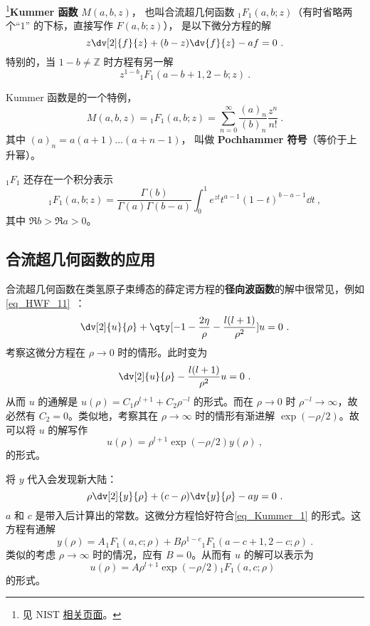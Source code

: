 \begin{issues}
\issueDraft
\end{issues}

\footnote{见 NIST \href{https://dlmf.nist.gov/13.2}{相关页面}。}\textbf{Kummer 函数} $M(a, b, z)$， 也叫合流超几何函数 $_1F_1(a, b; z)$（有时省略两个“$1$” 的下标，直接写作 $F(a, b; z)$）， 是以下微分方程的解
\begin{equation}\label{eq_Kummer_1}
z\dv[2]{f}{z} + (b-z)\dv{f}{z} - a f = 0~.
\end{equation}
特别的，当 $1 - b \neq \mathbb Z$ 时方程有另一解
$$z^{1-b} {_1F_1}(a-b+1, 2-b; z)~.$$

Kummer 函数是的一个特例， 
\begin{equation}
M(a, b, z) = {_1F_1}(a, b; z) = \sum_{n=0}^\infty \frac{(a)_n}{(b)_n} \frac{z^n}{n!}~.
\end{equation}
其中 $(a)_n = a(a+1)\dots(a+n-1)$， 叫做 \textbf{Pochhammer 符号}（等价于上升幂）。

${_1F_1}$ 还存在一个积分表示
\begin{equation}
{_1F_1}(a, b; z) = \frac{\Gamma(b)}{\Gamma(a) \Gamma(b-a)} \int_0^1 {e^{zt} t^{a-1} (1-t)^{b-a-1}\dd t} ~,
\end{equation}
其中 $\Re b > \Re a > 0$。

\subsection{合流超几何函数的应用}
合流超几何函数在类氢原子束缚态的薛定谔方程的\textbf{径向波函数}的解中很常见，例如\autoref{eq_HWF_11}~：
\begin{equation}
\dv[2]{u}{\rho} + \qty[-1 - \frac{2\eta}{\rho} - \frac{l(l+1)}{\rho^2}]u = 0~.
\end{equation}
考察这微分方程在 $\rho \rightarrow 0$ 时的情形。此时变为
\begin{equation}
\dv[2]{u}{\rho} - \frac{l(l+1)}{\rho^2} u = 0 ~.
\end{equation}
从而 $u$ 的通解是 $u(\rho) = C_1 \rho^{l+1} + C_2 \rho^{-l}$ 的形式。而在 $\rho \rightarrow 0$ 时 $\rho^{-l} \rightarrow \infty$，故必然有 $C_2 = 0$。类似地，考察其在 $\rho \rightarrow \infty$ 时的情形有渐进解 $\exp(-\rho/2)$。故可以将 $u$ 的解写作
\begin{equation}
u(\rho) = \rho^{l+1} \exp(-\rho/2) y(\rho) ~,
\end{equation}
的形式。

将 $y$ 代入会发现新大陆：
\begin{equation}
\rho \dv[2]{y}{\rho} + (c-\rho)\dv{y}{\rho} -ay = 0 ~.
\end{equation}
$a$ 和 $c$ 是带入后计算出的常数。这微分方程恰好符合\autoref{eq_Kummer_1} 的形式。这方程有通解
\begin{equation}
y(\rho) = A_{} {}_{1}F_1(a, c; \rho) + B \rho^{1-c}{}  _{1}F_{1}(a-c+1, 2-c; \rho) ~.
\end{equation}
类似的考虑 $\rho\rightarrow \infty$ 时的情况，应有 $B=0$。从而有 $u$ 的解可以表示为
\begin{equation}
u(\rho) = A \rho^{l+1} \exp(-\rho/2) {_1F_1}(a, c; \rho) ~~
\end{equation}
的形式。
